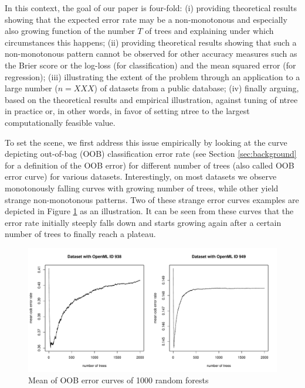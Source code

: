 \documentclass[paper=a4
               ,12pt
               ,DIV=12
               ,parskip=half
               ,titlepage=on
               ,headinclude 
               ,footinclude
               ,headsepline
               ,footsepline         %
               ,ilines 
               ]{scrartcl}
\begin{document}
In this context, the goal of our paper is four-fold: (i) providing theoretical results showing that the expected error rate may be a non-monotonous and especially also growing function of the number $T$ of trees and explaining under which circumstances 
this happens; (ii) providing theoretical results showing that such a non-monotonous pattern cannot be observed for other accuracy measures such as the Brier score or the log-loss (for classification) and the mean squared 
error (for regression); (iii) illustrating the extent of the problem through an application to a large number ($n=XXX$) of datasets from a public database; (iv) finally arguing, based on the theoretical results and empirical 
illustration, against tuning of ntree in practice or, in other words, in favor of setting ntree to the largest computationally feasible value.

To set the scene, we first address this issue empirically by looking at the curve depicting out-of-bag (OOB) classification error rate (see Section \ref{sec:background} for a definition of the OOB error) for different number 
of trees (also called OOB error curve) for various datasets. Interestingly, on most datasets we observe monotonously falling curves with growing number of trees, while other yield strange non-monotonous patterns. Two of these 
strange error curves examples are depicted in Figure \ref{fig:2examples} as an illustration. It can be seen from these curves that the error rate initially steeply falls down and  starts growing again after a certain number 
of trees to finally reach a plateau. 

\begin{figure}[!htb]
\begin{center}
  \includegraphics[width=\textwidth]{initial_example.pdf}
  \caption{Mean of OOB error curves of 1000 random forests}
   \label{fig:2examples}
\end{center}
\end{figure}
\end{document}
